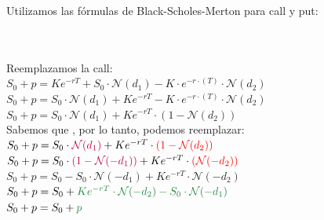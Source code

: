 \documentclass[12pt]{article}
\begin{document}
\noindent Utilizamos las fórmulas de Black-Scholes-Merton para call y put:
\begin{flushleft}
    
    \formula{\callbsm}\\[0.5em]
    \formula{\putbsm}\\[0.5em]
    Reemplazamos la call:\\[0.5em]
    $ S_0 + p = K e^{-rT} +S_0 \cdot \mathcal{N}(d_1)- K \cdot e^{-r \cdot (T)} \cdot \mathcal{N}(d_2)$\\ [0.3em]
    $ S_0 + p =S_0 \cdot \mathcal{N}(d_1)+ K e^{-rT} - K \cdot e^{-r \cdot (T)} \cdot \mathcal{N}(d_2)$\\ [0.3em]
    $ S_0 + p =S_0 \cdot \mathcal{N}(d_1)+ K e^{-rT} \cdot \left(1-\mathcal{N}(d_2)\right) $\\ [0.3em]
    Sabemos que \formula{\enemenosuno}, por lo tanto, podemos reemplazar:
    $ S_0 + p =S_0 \cdot \textcolor{purple}{\mathcal{N}(d_1)}+ K e^{-rT} \cdot \textcolor{red}{\left(1-\mathcal{N}(d_2)\right)} $\\ [0.3em]
    $ S_0 + p =S_0 \cdot \textcolor{purple}{\left(1-\mathcal{N}(-d_1)\right)}+ K e^{-rT} \cdot \textcolor{red}{\left(\mathcal{N}(-d_2)\right)} $\\ [0.3em]
    $ S_0 + p =S_0-S_0 \cdot \mathcal{N}(-d_1)+ K e^{-rT} \cdot \mathcal{N}(-d_2) $\\ [0.3em]
    $ S_0 + p =S_0+ \textcolor{grene}{K e^{-rT} \cdot \mathcal{N}(-d_2) -S_0 \cdot \mathcal{N}(-d_1)}$\\ [0.3em]
    $ S_0 + p =S_0+ \textcolor{grene}{p}$\\ [0.3em]

\end{flushleft}


\end{document}
